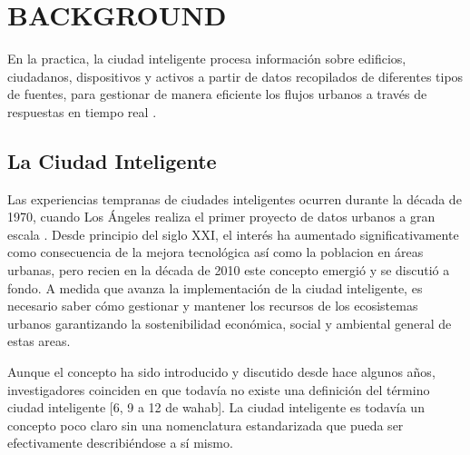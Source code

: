 \documentclass[a4paper,fleqn,spanish]{cas-dc}
\begin{document}
{{\section{BACKGROUND}\label{marco}



En la practica, la ciudad inteligente procesa información sobre edificios,
ciudadanos, dispositivos y activos a partir de datos recopilados de diferentes
tipos de fuentes, para gestionar de manera eficiente los flujos urbanos a
través de respuestas en tiempo real \cite{stubinger_understanding_2010}. 

\subsection{La Ciudad Inteligente}\label{concepto}

Las experiencias tempranas de ciudades inteligentes ocurren durante la década
de 1970, cuando Los Ángeles realiza el primer proyecto de datos urbanos a
gran escala \cite{stubinger_understanding_2010}. Desde principio del siglo XXI,
el interés ha aumentado significativamente como consecuencia de la mejora
tecnológica así como la poblacion en áreas urbanas, pero recien en la
década de 2010 este concepto emergió y se discutió a fondo. A medida que
avanza la implementación de la ciudad inteligente, es necesario saber cómo
gestionar y mantener los recursos de los ecosistemas urbanos
\cite{aljowder_systematic_2010} garantizando la sostenibilidad económica,
social y ambiental general \cite{stubinger_understanding_2010} de estas areas.

Aunque el concepto ha sido introducido y discutido desde hace algunos años,
investigadores coinciden en que todavía no existe una definición del término
ciudad inteligente [6, 9 a 12 de wahab]. La ciudad inteligente es todavía un
concepto poco claro sin una nomenclatura estandarizada que pueda ser
efectivamente describiéndose a sí mismo.

}}
\end{document}
